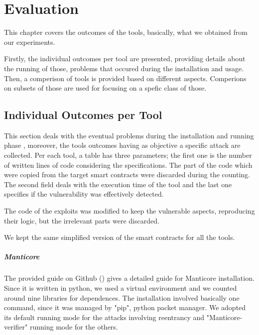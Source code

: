 
\chapter{Evaluation}
\label{ch:Evaluation}
This chapter covers the outcomes of the tools, basically, what we obtained from our experiments. 

Firstly, the individual outcomes per tool are presented, providing details about the running of those, 
problems that occured during the installation and usage. 
Then, a comperison of tools is provided based on different aspects. 
Comperions on subsets of those are used for focusing on a spefic class of those.




\section{Individual Outcomes per Tool}

This section deals with the eventual problems during the installation and running phase , 
moreover, the tools outcomes having as objective a specific attack are collected. 
Per each tool, a table has three parameters; the first one is the number of written lines of code considering the specifications. 
The part of the code which were copied from the target smart contracts were discarded during the counting. 
The second field deals with the execution time of the tool and the last one specifies if the vulnerability was effectively detected.

The code of the exploits was modified to keep the vulnerable aspects, reproducing their logic, but the irrelevant parts were discarded.

We kept the same simplified version of the smart contracts for all the tools.

\paragraph{Manticore} The provided guide on Github (\cite{ManticoreGitHub}) gives a detailed guide for Manticore installation. 
Since it is written in python, we used a virtual environment and we counted around nine libraries for dependences. 
The installation involved basically one command, since it was managed by "pip", python packet manager.
We adopted its default running mode for the attacks involving reentrancy and "Manticore-verifier" running mode for the others. 

